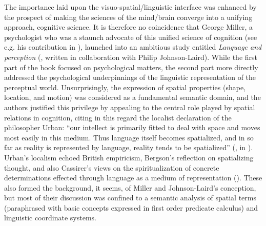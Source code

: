\documentclass[english,output=paper,colorlinks,citecolor=brown]{../langscibook}
\begin{document}
The importance laid upon the visuo-spatial\slash linguistic interface was enhanced by the prospect of making the sciences of the mind/brain converge into a unifying approach, cognitive science. It is therefore no coincidence that George Miller, a psychologist who was a staunch advocate of this unified science of cognition (see e.g. his contribution in \citealt{Walker1978}), launched into an ambitious study entitled \textit{Language and perception} (\citeyear{MillerJohnson-Laird1976}, written in collaboration with Philip Johnson-Laird). While the first part of the book focused on psychological matters, the second part more directly addressed the psychological underpinnings of the linguistic representation of the perceptual world. Unsurprisingly, the expression of spatial properties (shape, location, and motion) was considered as a fundamental semantic domain, and the authors justified this privilege by appealing to the central role played by spatial relations in cognition, citing in this regard the localist declaration of the philosopher Urban: “our intellect is primarily fitted to deal with space and moves most easily in this medium. Thus language itself becomes spatialized, and in so far as reality is represented by language, reality tends to be spatialized” (\citealt[186]{Urban1939}, in \citealt[375]{MillerJohnson-Laird1976}). Urban’s localism echoed British empiricism, Bergson’s reflection on spatializing thought, and also Cassirer’s views on the spiritualization of concrete determinations effected through language as a medium of representation (\citealt{Cassirer1923}). These also formed the background, it seems, of Miller and Johnson-Laird’s conception, but most of their discussion was confined to a semantic analysis of spatial terms (paraphrased with basic concepts expressed in first order predicate calculus) and linguistic coordinate systems.
\end{document}
